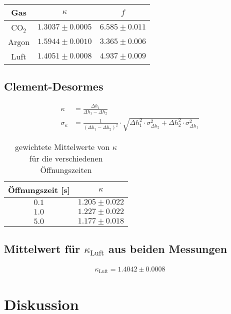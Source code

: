 \documentclass[12pt,a4paper,titlepage,headinclude,bibtotoc]{scrartcl}
\begin{document}
\begin{table}[!hbt]
	\centering
	\begin{tabular}{|c|c|c|}
		\hline
		Gas & $\kappa$ & $f$\\
		\hline
		\hline		
		CO$_2$ & $1.3037 \pm 0.0005$ & $6.585 \pm 0.011$ \\
		Argon & $1.5944 \pm 0.0010$ & $3.365 \pm 0.006$ \\
		Luft & $1.4051 \pm 0.0008$ & $4.937 \pm 0.009$ \\		
		\hline
	\end{tabular}
\end{table}


\subsection{Clement-Desormes}

\begin{align}
	\kappa&=\frac{\Delta h_{1}}{\Delta h_{1} - \Delta h_{2}}\\
	\sigma_{\kappa}&=\frac{1}{\left(\Delta h_{1} - \Delta h_{2}\right)^{2}} \cdot \sqrt{\Delta h_{1}^{2} \cdot \sigma_{\Delta h_2}^{2} + \Delta h_{2}^{2} \cdot \sigma_{\Delta h_1}^{2}}
\end{align}

\begin{table}[!htb]
	\centering
	\begin{tabular}{|c|c|}
		\hline
		Öffnungszeit [s] & $\kappa$\\
		\hline
		$ 0.1 $ & $ 1.205 \pm 0.022 $ \\
		$ 1.0 $ & $ 1.227 \pm 0.022 $ \\
		$ 5.0 $ & $ 1.177 \pm 0.018 $ \\
		\hline
	\end{tabular}
	\caption{gewichtete Mittelwerte von $\kappa$ \\ für die verschiedenen Öffnungszeiten}
\end{table}

\subsection{Mittelwert für $\kappa_\text{Luft}$ aus beiden Messungen}
\begin{align}
	\kappa_\text{Luft}=1.4042 \pm 0.0008
\end{align}

\section{Diskussion}
\label{sec:diskussion}
\end{document}
